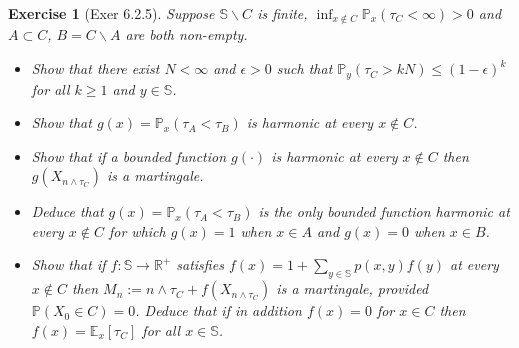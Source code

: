 \documentclass[11pt,a4paper]{article}
\numberwithin{equation}{section}%
\newtheorem{exercise}{Exercise}[]
\begin{document}
\begin{exercise}[Exer 6.2.5]

    Suppose $ \mathbb{S}\backslash C $ is finite, $ \inf_{x \not\in  C} \mathbb{P}_x(\tau_C < \infty) > 0 $ and $ A \subset C $, $ B = C \backslash A $ are both non-empty.
    \begin{itemize}[topsep=0pt,itemsep=-8pt]
        \item[(a)] Show that there exist $ N < \infty $ and $ \epsilon > 0 $ such that $ \mathbb{P}_y(\tau_C > kN) \leq (1-\epsilon)^k $ for all $ k \geq 1 $ and $ y \in \mathbb{S} $.
        \item[(b)] Show that $ g(x) = \mathbb{P}_x(\tau_A < \tau_B) $ is harmonic at every $ x \not\in C $.
        \item[(c)] Show that if a bounded function $ g(\cdot) $ is harmonic at every $ x \not\in C $ then $ g(X_{n \wedge \tau_C}) $ is a martingale.
        \item[(d)] Deduce that $ g(x) = \mathbb{P}_x(\tau_A < \tau_B) $ is the only bounded function harmonic at every $ x \not\in C $ for which $ g(x) = 1 $ when $ x \in A $ and $ g(x) = 0 $ when $ x \in B $.
        \item[(e)] Show that if $ f : \mathbb{S} \to \mathbb{R}^+ $ satisfies $ f(x) = 1 + \sum_{y \in \mathbb{S}} p(x, y)f(y) $ at every $ x \not\in C $ then $ M_n := n \wedge \tau_C + f(X_{n \wedge \tau_C}) $ is a martingale, provided $ \mathbb{P}(X_0 \in C) = 0 $. Deduce that if in addition $ f(x) = 0 $ for $ x \in C $ then $ f(x) = \mathbb{E}_x[\tau_C] $ for all $ x \in \mathbb{S} $.
        
    \end{itemize}
    
\end{exercise}
\end{document}

